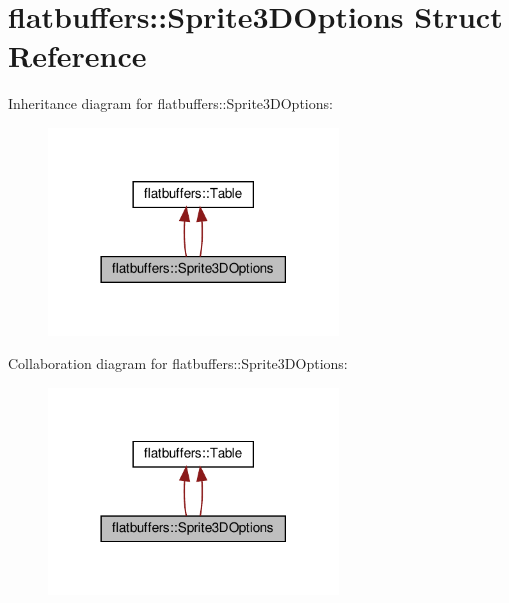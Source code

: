 \hypertarget{structflatbuffers_1_1Sprite3DOptions}{}\section{flatbuffers\+:\+:Sprite3\+D\+Options Struct Reference}
\label{structflatbuffers_1_1Sprite3DOptions}


Inheritance diagram for flatbuffers\+:\+:Sprite3\+D\+Options\+:
\nopagebreak
\begin{figure}[H]
\begin{center}
\leavevmode
\includegraphics[width=218pt]{structflatbuffers_1_1Sprite3DOptions__inherit__graph}
\end{center}
\end{figure}


Collaboration diagram for flatbuffers\+:\+:Sprite3\+D\+Options\+:
\nopagebreak
\begin{figure}[H]
\begin{center}
\leavevmode
\includegraphics[width=218pt]{structflatbuffers_1_1Sprite3DOptions__coll__graph}
\end{center}
\end{figure}
